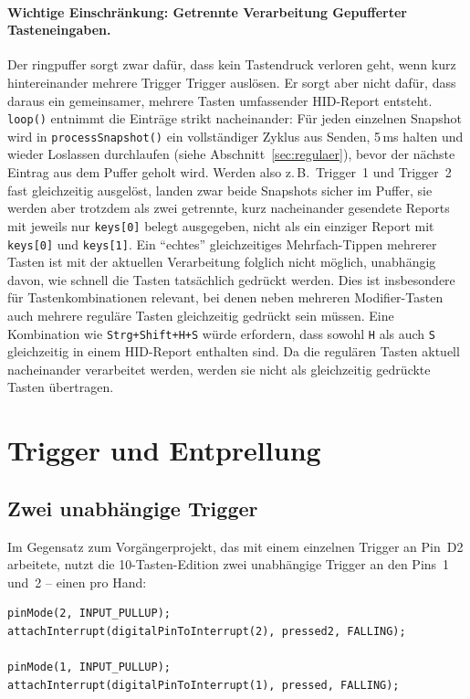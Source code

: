 \documentclass{article}
\begin{document}
\paragraph{Wichtige Einschränkung: Getrennte Verarbeitung Gepufferter Tasteneingaben.}
Der \gls{ringpuffer} sorgt zwar dafür, dass kein Tastendruck verloren geht, wenn kurz hintereinander mehrere Trigger Trigger auslösen. Er sorgt aber nicht dafür, dass daraus ein gemeinsamer, mehrere Tasten umfassender HID-Report entsteht. \texttt{loop()} entnimmt die Einträge strikt nacheinander: Für jeden einzelnen Snapshot wird in \texttt{processSnapshot()} ein vollständiger Zyklus aus Senden, 5\,ms halten und wieder Loslassen durchlaufen (siehe Abschnitt~\ref{sec:regulaer}), bevor der nächste Eintrag aus dem Puffer geholt wird. Werden also z.\,B.\ Trigger~1 und Trigger~2 fast gleichzeitig ausgelöst, landen zwar beide Snapshots sicher im Puffer, sie werden aber trotzdem als zwei getrennte, kurz nacheinander gesendete Reports mit jeweils nur \texttt{keys[0]} belegt ausgegeben, nicht als ein einziger Report mit \texttt{keys[0]} und \texttt{keys[1]}. Ein \enquote{echtes} gleichzeitiges Mehrfach-Tippen mehrerer Tasten ist mit der aktuellen Verarbeitung folglich nicht möglich, unabhängig davon, wie schnell die Tasten tatsächlich gedrückt werden. Dies ist insbesondere für Tastenkombinationen relevant, bei denen neben mehreren Modifier-Tasten auch mehrere reguläre Tasten gleichzeitig gedrückt sein müssen. Eine Kombination wie \texttt{Strg+Shift+H+S} würde erfordern, dass sowohl \texttt{H} als auch \texttt{S} gleichzeitig in einem HID-Report enthalten sind. Da die regulären Tasten aktuell nacheinander verarbeitet werden, werden sie nicht als gleichzeitig gedrückte Tasten übertragen.


\section{Trigger und Entprellung}

\subsection{Zwei unabhängige Trigger}
Im Gegensatz zum Vorgängerprojekt, das mit einem einzelnen Trigger an Pin~D2 arbeitete, nutzt die 10-Tasten-Edition zwei unabhängige Trigger an den Pins~1 und~2 -- einen pro Hand:

\begin{lstlisting}[style=arduino]
pinMode(2, INPUT_PULLUP);
attachInterrupt(digitalPinToInterrupt(2), pressed2, FALLING);

pinMode(1, INPUT_PULLUP);
attachInterrupt(digitalPinToInterrupt(1), pressed, FALLING);
\end{lstlisting}
\end{document}
